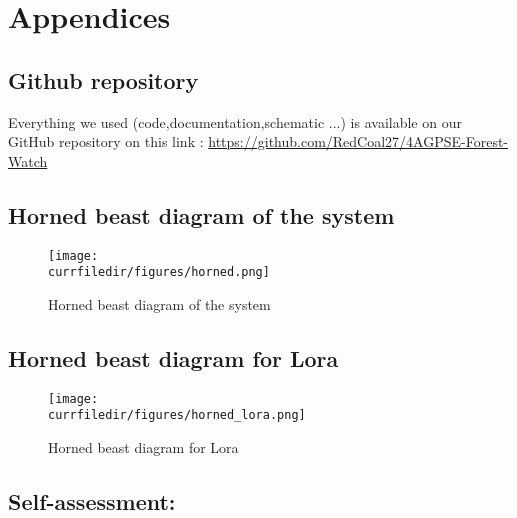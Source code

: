 \newpage
\section*{Appendices}

\subsection*{Github repository}
Everything we used (code,documentation,schematic ...) is available on our GitHub repository on this link : \url{https://github.com/RedCoal27/4AGPSE-Forest-Watch}

\subsection*{Horned beast diagram of the system}
\begin{figure}[!h]
    \centering
    \texttt{[image: \\currfiledir/figures/horned.png]}
    \caption{Horned beast diagram of the system}
\end{figure}

\subsection*{Horned beast diagram for Lora}
\begin{figure}[!h]
    \centering
    \texttt{[image: \\currfiledir/figures/horned\_lora.png]}
    \caption{Horned beast diagram for Lora}
\end{figure}

\newpage
\subsection*{Self-assessment:}





